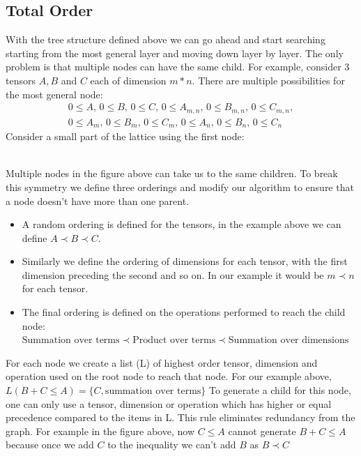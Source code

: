 \documentclass{article}
\begin{document}
\subsection{Total Order}
\label{subsec:totOrder}
With the tree structure defined above we can go ahead and start searching starting from the most general layer and moving down layer by layer. The only problem is that multiple nodes can have the same child. 
For example, consider 3 tensors $A, B$ and $C$ each of dimension $m*n$. There are multiple possibilities for the most general node:
\begin{multline*}
    0 \le A,\, 0 \le B,\, 0\le C,\, 
    0 \le A_{m,n},\, 0 \le B_{m,n},\, 0\le C_{m,n},\\
    0 \le A_m,\, 0 \le B_m,\, 0\le C_m,\,
    0 \le A_n,\, 0 \le B_n,\, 0\le C_n
\end{multline*}
Consider a small part of the lattice using the first node:
\\
Multiple nodes in the figure above can take us to the same children. To break this symmetry we define three orderings and modify our algorithm to ensure that a node doesn't have more than one parent.
\begin{itemize}
    \item A random ordering is defined for the tensors, in the example above we can define $A \prec B \prec C$.
    \item Similarly we define the ordering of dimensions for each tensor, with the first dimension preceding the second and so on. In our example it would be $m \prec n$ for each tensor.
    \item The final ordering is defined on the operations performed to reach the child node: $\text{Summation over terms} \prec \text{Product over terms} \prec \text{Summation over dimensions}$
\end{itemize}
For each node we create a list (L) of highest order tensor, dimension and operation used on the root node to reach that node. For our example above, $L(B+C \le A)=\{C,\text{summation over terms}\}$
To generate a child for this node, one can only use a tensor, dimension or operation which has higher or equal precedence compared to the items in L.
This rule eliminates redundancy from the graph. For example in the figure above, now $C\le A$ cannot generate $B+C\le A$ because once we add $C$ to the inequality we can't add $B$ as $B \prec C$
\end{document}

